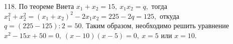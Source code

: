 118. По теореме Виета $x_1+x_2=15,\ x_1x_2=q,$ тогда $x_1^2+x_2^2=(x_1+x_2)^2-2x_1x_2=225-2q=125,$ откуда $q=(225-125):2=50.$ Таким образом, необходимо решить уравнение $x^2-15x+50=0,\ (x-10)(x-5)=0,\ x=5$ или $x=10.$\\
